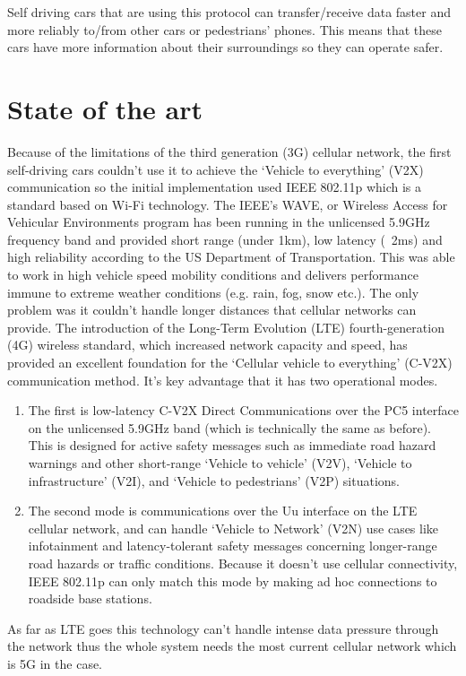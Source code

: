 \documentclass[conference]{IEEEtran}
\begin{document}
Self driving cars that are using this protocol can transfer/receive data faster and more reliably to/from other cars or pedestrians' phones. This means that these cars have more information about their surroundings so they can operate safer.

\section{State of the art}
Because of the limitations of the third generation (3G) cellular network, the first self-driving cars couldn’t use it to achieve the ‘Vehicle to everything’ (V2X) communication so the initial implementation used IEEE 802.11p  which is a standard based on Wi-Fi technology. The IEEE's WAVE, or Wireless Access for Vehicular Environments program has been running in the unlicensed 5.9GHz frequency band and provided short range (under 1km), low latency (~2ms) and high reliability according to the US Department of Transportation. This was able to work in high vehicle speed mobility conditions and delivers performance immune to extreme weather conditions (e.g. rain, fog, snow etc.). The only problem was it couldn’t handle longer distances that cellular networks can provide. The introduction of the Long-Term Evolution (LTE) fourth-generation (4G) wireless standard, which increased network capacity and speed, has provided an excellent foundation for the ‘Cellular vehicle to everything’ (C-V2X) communication method. It’s key advantage that it has two operational modes.

\begin{enumerate}
    \item The first is low-latency C-V2X Direct Communications over the PC5 interface on the unlicensed 5.9GHz band (which is technically the same as before). This is designed for active safety messages such as immediate road hazard warnings and other short-range ‘Vehicle to vehicle’ (V2V), ‘Vehicle to infrastructure’ (V2I), and ‘Vehicle to pedestrians’ (V2P) situations.
    \item The second mode is communications over the Uu interface on the LTE cellular network, and can handle ‘Vehicle to Network’ (V2N) use cases like infotainment and latency-tolerant safety messages concerning longer-range road hazards or traffic conditions. Because it doesn't use cellular connectivity, IEEE 802.11p can only match this mode by making ad hoc connections to roadside base stations.
\end{enumerate}

As far as LTE goes this technology can’t handle intense data pressure through the network thus the whole system needs the most current cellular network which is 5G in the case.
\end{document}
